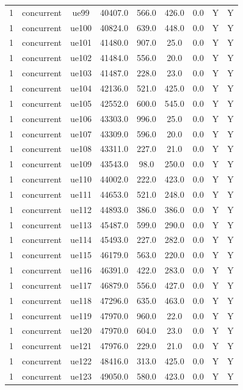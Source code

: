 \begin{table}[ht]
\begin{tabular}{|c|c|c|c|c|c|c|c|c|}
1 & concurrent & ue99 & 40407.0 & 566.0 & 426.0 & 0.0 & Y & Y \\
1 & concurrent & ue100 & 40824.0 & 639.0 & 448.0 & 0.0 & Y & Y \\
1 & concurrent & ue101 & 41480.0 & 907.0 & 25.0 & 0.0 & Y & Y \\
1 & concurrent & ue102 & 41484.0 & 556.0 & 20.0 & 0.0 & Y & Y \\
1 & concurrent & ue103 & 41487.0 & 228.0 & 23.0 & 0.0 & Y & Y \\
1 & concurrent & ue104 & 42136.0 & 521.0 & 425.0 & 0.0 & Y & Y \\
1 & concurrent & ue105 & 42552.0 & 600.0 & 545.0 & 0.0 & Y & Y \\
1 & concurrent & ue106 & 43303.0 & 996.0 & 25.0 & 0.0 & Y & Y \\
1 & concurrent & ue107 & 43309.0 & 596.0 & 20.0 & 0.0 & Y & Y \\
1 & concurrent & ue108 & 43311.0 & 227.0 & 21.0 & 0.0 & Y & Y \\
1 & concurrent & ue109 & 43543.0 & 98.0 & 250.0 & 0.0 & Y & Y \\
1 & concurrent & ue110 & 44002.0 & 222.0 & 423.0 & 0.0 & Y & Y \\
1 & concurrent & ue111 & 44653.0 & 521.0 & 248.0 & 0.0 & Y & Y \\
1 & concurrent & ue112 & 44893.0 & 386.0 & 386.0 & 0.0 & Y & Y \\
1 & concurrent & ue113 & 45487.0 & 599.0 & 290.0 & 0.0 & Y & Y \\
1 & concurrent & ue114 & 45493.0 & 227.0 & 282.0 & 0.0 & Y & Y \\
1 & concurrent & ue115 & 46179.0 & 563.0 & 220.0 & 0.0 & Y & Y \\
1 & concurrent & ue116 & 46391.0 & 422.0 & 283.0 & 0.0 & Y & Y \\
1 & concurrent & ue117 & 46879.0 & 556.0 & 427.0 & 0.0 & Y & Y \\
1 & concurrent & ue118 & 47296.0 & 635.0 & 463.0 & 0.0 & Y & Y \\
1 & concurrent & ue119 & 47970.0 & 960.0 & 22.0 & 0.0 & Y & Y \\
1 & concurrent & ue120 & 47970.0 & 604.0 & 23.0 & 0.0 & Y & Y \\
1 & concurrent & ue121 & 47976.0 & 229.0 & 21.0 & 0.0 & Y & Y \\
1 & concurrent & ue122 & 48416.0 & 313.0 & 425.0 & 0.0 & Y & Y \\
1 & concurrent & ue123 & 49050.0 & 580.0 & 423.0 & 0.0 & Y & Y \\

\end{tabular}
\end{table}
